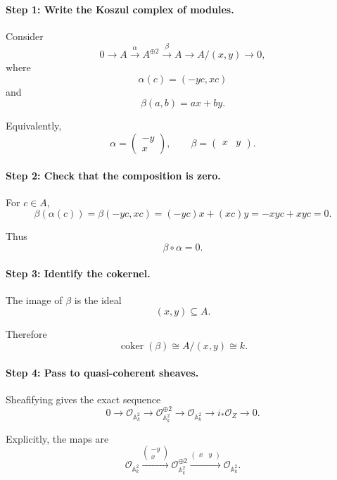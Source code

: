 \documentclass[12pt,a4paper]{article}
\theoremstyle{notespace}
\begin{document}
\paragraph{Step 1: Write the Koszul complex of modules.}

Consider
\[
0
\longrightarrow
A
\xrightarrow{\alpha}
A^{\oplus 2}
\xrightarrow{\beta}
A
\longrightarrow
A/(x,y)
\longrightarrow
0,
\]
where
\[
\alpha(c)=(-yc,xc)
\]
and
\[
\beta(a,b)=ax+by.
\]

Equivalently,
\[
\alpha
=
\begin{pmatrix}
	-y\\
	x
\end{pmatrix},
\qquad
\beta
=
\begin{pmatrix}
	x & y
\end{pmatrix}.
\]

\paragraph{Step 2: Check that the composition is zero.}

For \(c\in A\),
\[
\beta(\alpha(c))
=
\beta(-yc,xc)
=
(-yc)x+(xc)y
=
-xyc+xyc
=
0.
\]

Thus
\[
\beta\circ\alpha=0.
\]

\paragraph{Step 3: Identify the cokernel.}

The image of \(\beta\) is the ideal
\[
(x,y)\subseteq A.
\]

Therefore
\[
\operatorname{coker}(\beta)
\cong
A/(x,y)
\cong
k.
\]

\paragraph{Step 4: Pass to quasi-coherent sheaves.}

Sheafifying gives the exact sequence
\[
0
\longrightarrow
\mathcal{O}_{\mathbb{A}^{2}_{k}}
\longrightarrow
\mathcal{O}_{\mathbb{A}^{2}_{k}}^{\oplus 2}
\longrightarrow
\mathcal{O}_{\mathbb{A}^{2}_{k}}
\longrightarrow
i_{*}\mathcal{O}_{Z}
\longrightarrow
0.
\]

Explicitly, the maps are
\[
\mathcal{O}_{\mathbb{A}^{2}_{k}}
\xrightarrow{\left(\begin{smallmatrix}-y\\ x\end{smallmatrix}\right)}
\mathcal{O}_{\mathbb{A}^{2}_{k}}^{\oplus 2}
\xrightarrow{\left(\begin{smallmatrix}x & y\end{smallmatrix}\right)}
\mathcal{O}_{\mathbb{A}^{2}_{k}}.
\]
\end{document}
